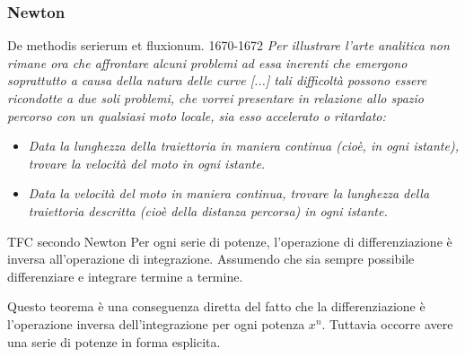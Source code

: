 \begin{frame}[label=Newton]
  \frametitle{Newton}

  \begin{block}{De methodis serierum et fluxionum. 1670-1672}
    \textit{Per illustrare l'arte analitica non rimane ora che affrontare alcuni problemi
    ad essa inerenti che emergono soprattutto a causa della natura delle curve [...]
    tali difficoltà possono essere ricondotte a due soli problemi, che vorrei presentare 
    in relazione allo spazio percorso con un qualsiasi moto locale, sia esso accelerato
    o ritardato:}
  
    \begin{itemize}
      \item
      \textit{Data la lunghezza della traiettoria in maniera continua (cioè, in ogni istante),
        trovare la velocità del moto in ogni istante.}
      \item
      \textit{Data la velocità del moto in maniera continua, trovare la lunghezza della traiettoria
        descritta (cioè della distanza percorsa) in ogni istante.}
      \end{itemize}
  \end{block}

\end{frame}

\begin{frame}[label=Newton teorema]
    \begin{block}{TFC secondo Newton}
      Per ogni serie di potenze, l'operazione di differenziazione è 
      inversa all'operazione di integrazione. Assumendo che sia sempre possibile
      differenziare e integrare termine a termine.
    \end{block}
    \pause
    Questo teorema è una conseguenza diretta del fatto che la differenziazione è
    l'operazione inversa dell'integrazione per ogni potenza $x^n$. Tuttavia occorre
    avere una serie di potenze in forma esplicita.
  
\end{frame}